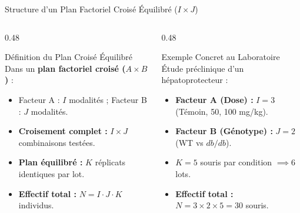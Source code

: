 \documentclass[aspectratio=169,10pt]{beamer}
\begin{document}
\begin{frame}{Structure d'un Plan Factoriel Croisé Équilibré ($I \times J$)}
  \begin{columns}[onlytextwidth, T]
    \begin{column}{0.48\linewidth}
      \begin{conceptbox}{Définition du Plan Croisé Équilibré}
        \small
        Dans un \textbf{plan factoriel croisé ($A \times B$)} :
        \begin{itemize}
          \item Facteur A : $I$ modalités ; Facteur B : $J$ modalités.
          \item \textbf{Croisement complet :} $I \times J$ combinaisons testées.
          \item \textbf{Plan équilibré :} $K$ réplicats identiques par lot.
          \item \textbf{Effectif total :} $N = I \cdot J \cdot K$ individus.
        \end{itemize}
      \end{conceptbox}
    \end{column}
    \begin{column}{0.48\linewidth}
      \begin{biobox}{Exemple Concret au Laboratoire}
        \small
        Étude préclinique d'un hépatoprotecteur :
        \begin{itemize}
          \item \textbf{Facteur A (Dose) :} $I = 3$ (Témoin, 50, 100 mg/kg).
          \item \textbf{Facteur B (Génotype) :} $J = 2$ (WT vs $db/db$).
          \item $K = 5$ souris par condition $\implies 6$ lots.
          \item \textbf{Effectif total :} $N = 3 \times 2 \times 5 = 30$ souris.
        \end{itemize}
      \end{biobox}
    \end{column}
  \end{columns}
\end{frame}
\end{document}
